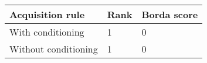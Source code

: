 \begin{tabular}{lll}
Acquisition rule & Rank & Borda score \\ 
\hline 
With conditioning & 1 & 0 \\ 
Without conditioning & 1 & 0 \\ 
\hline 
\end{tabular}